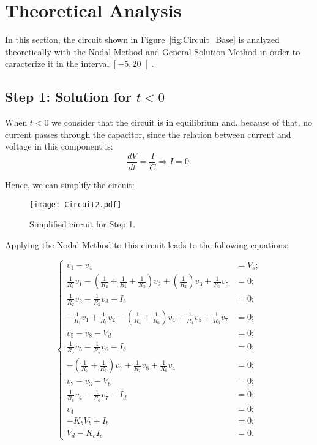 \section{Theoretical Analysis}
\label{sec:analysis}

In this section, the circuit shown in Figure~\ref{fig:Circuit_Base} is analyzed theoretically with the Nodal Method and General Solution Method in order to caracterize it in the interval $\left[-5,20\right[$.

\subsection{Step 1: Solution for $t<0$}

When $t<0$ we consider that the circuit is in equilibrium and, because of that, no current passes through the capacitor, since the relation between current and voltage in this component is:
\begin{equation}
  \frac{dV}{dt}=\frac{I}{C} \Rightarrow I = 0.
  \label{eq:Cap}
\end{equation}

Hence, we can simplify the circuit:
\begin{figure}[h] \centering
\texttt{[image: Circuit2.pdf]}
\caption{Simplified circuit for Step 1.}
\label{fig:Circuit_Passo1}
\end{figure}

Applying the Nodal Method to this circuit leads to the following equations:

\begin{equation}
\begin{cases}
	v_1 - v_4 &= V_s;																				  \\
	\frac{1}{R_1}v_1 - (\frac{1}{R_2}+\frac{1}{R_1}+\frac{1}{R_3})v_2 + (\frac{1}{R_2})v_3 + \frac{1}{R_3}v_5 &= 0; 																						  \\
  	\frac{1}{R_2}v_2 - \frac{1}{R_2}v_3+ I_b &= 0;													  \\
  	-\frac{1}{R_1}v_1 + \frac{1}{R_1}v_2 - (\frac{1}{R_4}+\frac{1}{R_6})v_4 + \frac{1}{R_4}v_5 + \frac{1}{R_6}v_7 &= 0;			  																	  \\
	v_5 - v_8 - V_d &= 0;																			  \\
  	\frac{1}{R_5}v_5 - \frac{1}{R_5}v_6 - I_b &= 0;												  	  \\
  	-(\frac{1}{R_7}+\frac{1}{R_6})v_7 + \frac{1}{R_7}v_8 + \frac{1}{R_6}v_4 &= 0;					  \\
	v_2 - v_3 - V_b &= 0;																			  \\
  	\frac{1}{R_6}v_4 - \frac{1}{R_6}v_7 - I_d &= 0;													  \\
  	v_4 &= 0;																						  \\
  	-K_bV_b + I_b &= 0;																				  \\
  	V_d - K_cI_c &= 0.
\end{cases}
\end{equation}

